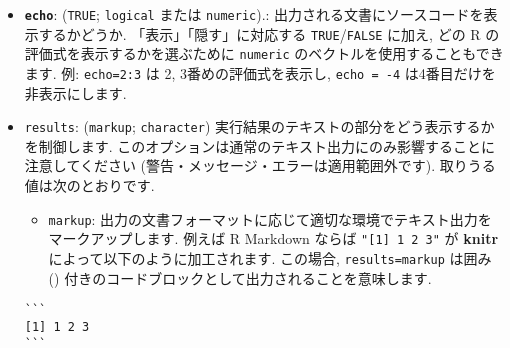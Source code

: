 \documentclass[
]{bxjsreport}
\providecommand{\tightlist}{%
  \setlength{\itemsep}{0pt}\setlength{\parskip}{0pt}}
\begin{document}
\begin{itemize}
\tightlist
\item
  \textbf{\texttt{echo}}: (\texttt{TRUE}; \texttt{logical} または
  \texttt{numeric}).: 出力される文書にソースコードを表示するかどうか.
  「表示」「隠す」に対応する \texttt{TRUE}/\texttt{FALSE} に加え, どの R
  の評価式を表示するかを選ぶために \texttt{numeric}
  のベクトルを使用することもできます. 例: \texttt{echo=2:3} は 2,
  3番めの評価式を表示し, \texttt{echo\ =\ -4}
  は4番目だけを非表示にします.
\item
  \texttt{results}:
  (\texttt{\textquotesingle{}markup\textquotesingle{}};
  \texttt{character})
  実行結果のテキストの部分をどう表示するかを制御します.
  このオプションは通常のテキスト出力にのみ影響することに注意してください
  (警告・メッセージ・エラーは適用範囲外です).
  取りうる値は次のとおりです.

  \begin{itemize}
  \tightlist
  \item
    \texttt{markup}:
    出力の文書フォーマットに応じて適切な環境でテキスト出力をマークアップします.
    例えば R Markdown ならば \texttt{"{[}1{]}\ 1\ 2\ 3"} が
    \textbf{knitr} によって以下のように加工されます. この場合,
    \texttt{results=\textquotesingle{}markup\textquotesingle{}} は囲み
    (\texttt{\textasciigrave{}\textasciigrave{}\textasciigrave{}})
    付きのコードブロックとして出力されることを意味します.
  \end{itemize}

\begin{verbatim}
```
[1] 1 2 3
```
\end{verbatim}


\end{itemize}
\end{document}
